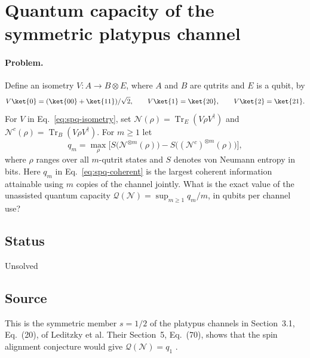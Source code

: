 \section{Quantum capacity of the symmetric platypus channel}
\label{sec:op_dfb4aa012543d43a}

\paragraph{Problem.}
Define an isometry $V:A\to B\otimes E$, where $A$ and $B$ are qutrits and $E$ is a qubit, by
\begin{equation}
  V\ket{0}=(\ket{00}+\ket{11})/\sqrt2,\qquad
  V\ket{1}=\ket{20},\qquad V\ket{2}=\ket{21}.
  \label{eq:spq-isometry}
\end{equation}
For $V$ in Eq.~\eqref{eq:spq-isometry}, set $\mathcal{N}(\rho)=\operatorname{Tr}_E(V\rho V^\dagger)$ and $\mathcal{N}^c(\rho)=\operatorname{Tr}_B(V\rho V^\dagger)$. For $m\geq1$ let
\begin{equation}
 q_m=\max_{\rho}\Big[
 S\bigl(\mathcal{N}^{\otimes m}(\rho)\bigr)-
 S\bigl((\mathcal{N}^c)^{\otimes m}(\rho)\bigr)\Big],
 \label{eq:spq-coherent}
\end{equation}
where $\rho$ ranges over all $m$-qutrit states and $S$ denotes von Neumann entropy in bits. Here $q_m$ in Eq.~\eqref{eq:spq-coherent} is the largest coherent information attainable using $m$ copies of the channel jointly. What is the exact value of the unassisted quantum capacity $\mathcal{Q}(\mathcal{N})=\sup_{m\geq1}q_m/m$, in qubits per channel use?

\subsection*{Status}

Unsolved

\subsection*{Source}

This is the symmetric member $s=1/2$ of the platypus channels in Section~3.1, Eq.~(20), of Leditzky et al. Their Section~5, Eq.~(70), shows that the spin alignment conjecture would give $\mathcal{Q}(\mathcal{N})=q_1$ .

